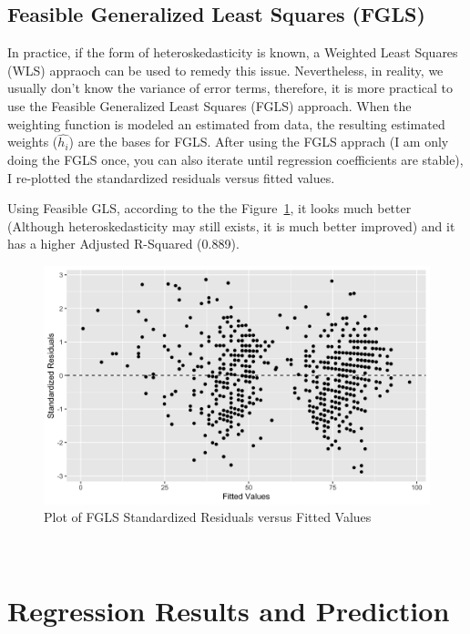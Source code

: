 \documentclass{article}
\begin{document}
\subsection{Feasible Generalized Least Squares (FGLS)}
In practice, if the form of heteroskedasticity is known, a Weighted Least Squares (WLS) appraoch can be used to remedy this issue. Nevertheless, in reality, we usually don't know the variance of error terms, therefore, it is more practical to use the Feasible Generalized Least Squares (FGLS) approach. 	When the weighting function is modeled an estimated from data, the resulting estimated weights ($\widehat{h_{i}}$) are the bases for FGLS. After using the FGLS apprach (I am only doing the FGLS once, you can also iterate until regression coefficients are stable), I re-plotted the standardized residuals versus fitted values. 

Using Feasible GLS, according to the the Figure~\ref{fig: 15}, it looks much better (Although 
heteroskedasticity may still exists, it is much better improved) and it has a higher Adjusted R-Squared (0.889). 

\begin{figure}[htbp]
\begin{center}
\caption{Plot of FGLS Standardized Residuals versus Fitted Values}
\includegraphics[scale=0.3]{fgls_residuals.png}
\end{center}
\label{fig: 15}
\end{figure}
\mbox{~} %
\newpage

\section{Regression Results and Prediction}
\end{document}
